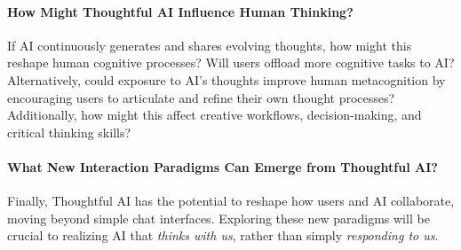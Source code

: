 \paragraph{How Might Thoughtful AI Influence Human Thinking?}
If AI continuously generates and shares evolving thoughts, how might this reshape human cognitive processes? Will users offload more cognitive tasks to AI? Alternatively, could exposure to AI's thoughts improve human metacognition by encouraging users to articulate and refine their own thought processes? Additionally, how might this affect creative workflows, decision-making, and critical thinking skills? 


\paragraph{What New Interaction Paradigms Can Emerge from Thoughtful AI?}
Finally, Thoughtful AI has the potential to reshape how users and AI collaborate, moving beyond simple chat interfaces. Exploring these new paradigms will be crucial to realizing AI that \emph{thinks with us}, rather than simply \emph{responding to us}.

